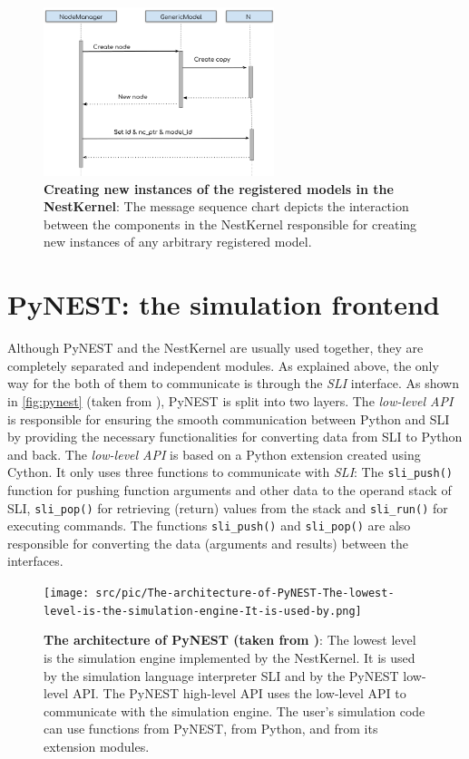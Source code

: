 \begin{figure}[ht!]
\centering
\includegraphics[width=0.6\textwidth]{src/pic/nodes_creation.png}
\caption{\textbf{Creating new instances of the registered models in the NestKernel}: The message sequence chart depicts the interaction between the components in the NestKernel responsible for creating new instances of any arbitrary registered model.}
\label{fig:nestkernel_creation}
\end{figure}

\section{PyNEST: the simulation frontend}

Although PyNEST and the NestKernel are usually used together, they are completely separated and independent modules. As explained above, the only way for the both of them to communicate is through the \emph{SLI} interface. As shown in \autoref{fig:pynest} (taken from \citep{epp}), PyNEST is split into two layers. The \emph{low-level API} is responsible for ensuring the smooth communication between Python and SLI by providing the necessary functionalities for converting data from SLI to Python and back. The \emph{low-level API} is based on a Python extension created using Cython. It only uses three functions to communicate with \emph{SLI}: The \texttt{sli\_push()} function for pushing function arguments and other data to the operand stack of SLI, \texttt{sli\_pop()} for retrieving (return) values from the stack and \texttt{sli\_run()} for executing commands. The functions \texttt{sli\_push()} and \texttt{sli\_pop()} are also responsible for converting the data (arguments and results) between the interfaces.


\begin{figure}[ht!]
\centering
\texttt{[image: src/pic/The-architecture-of-PyNEST-The-lowest-level-is-the-simulation-engine-It-is-used-by.png]}
\caption{\textbf{The architecture of PyNEST (taken from \citep{epp})}: The lowest level is the simulation engine implemented by the NestKernel. It is used by the simulation language interpreter SLI and by the PyNEST low-level API. The PyNEST high-level API uses the low-level API to communicate with the simulation engine. The user’s simulation code can use functions from PyNEST, from Python, and from its extension modules.}
\label{fig:pynest}
\end{figure}

